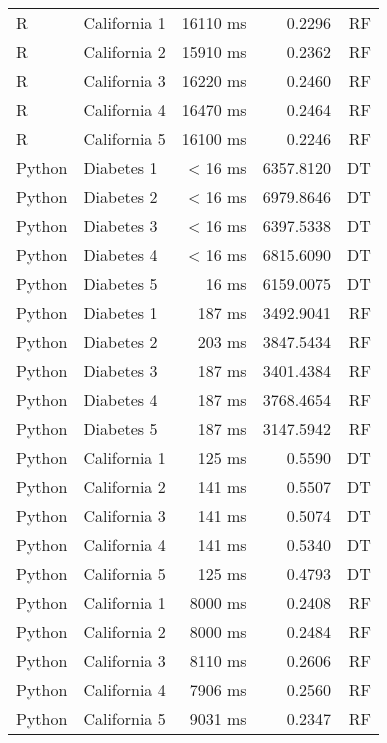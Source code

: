 \begin{longtable}{llrrr}
  \addlinespace
  R & California 1               & 16110 ms               &  0.2296  & RF  \\
  R & California 2               & 15910 ms               &  0.2362  & RF  \\
  R & California 3               & 16220 ms              &  0.2460   & RF \\
  R & California 4               & 16470 ms               &  0.2464  & RF  \\
  R & California 5               & 16100 ms               &  0.2246  & RF  \\
  \addlinespace
  Python & Diabetes 1               & < 16 ms               &  6357.8120 & DT   \\
  Python & Diabetes 2               & < 16 ms               &  6979.8646 & DT   \\
  Python & Diabetes 3               & < 16 ms               &  6397.5338  & DT  \\
  Python & Diabetes 4               & < 16 ms               &  6815.6090  & DT  \\
  Python & Diabetes 5               & 16 ms               &  6159.0075  & DT  \\
  \addlinespace
  Python & Diabetes 1               & 187 ms               &  3492.9041 & RF   \\
  Python & Diabetes 2               & 203 ms               &  3847.5434  & RF  \\
  Python & Diabetes 3               & 187 ms               &  3401.4384  & RF  \\
  Python & Diabetes 4               & 187 ms               &  3768.4654  & RF  \\
  Python & Diabetes 5               & 187 ms               &  3147.5942 & RF   \\
  \addlinespace
  Python & California 1               & 125 ms              &  0.5590  & DT  \\
  Python & California 2               & 141 ms               &  0.5507  & DT  \\
  Python & California 3               & 141 ms               &  0.5074  & DT  \\
  Python & California 4               & 141 ms               &  0.5340  & DT  \\
  Python & California 5               & 125 ms              &  0.4793  & DT  \\
  \addlinespace
  Python & California 1               & 8000 ms               &  0.2408  & RF  \\
  Python & California 2               & 8000 ms               &  0.2484  & RF  \\
  Python & California 3               & 8110 ms              &  0.2606  & RF  \\
  Python & California 4               & 7906 ms               &  0.2560 & RF   \\
  Python & California 5               & 9031 ms               &  0.2347  & RF  \\
\hline
\end{longtable}